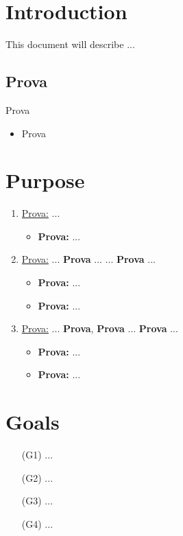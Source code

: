 \documentclass [12pt]{article}
\begin{document}
\tableofcontents

\section{Introduction}
This document will describe ...
\subsection{Prova}
Prova
\begin{itemize}
\item Prova
\end{itemize}
\section{Purpose}
\begin{enumerate}
\item \underline{Prova:} ...
\begin{itemize}[•]
\item \textbf{Prova:} ...
\end{itemize}
\item \underline{Prova:} ... \textbf{Prova} ... 
... \textbf{Prova} ...
\begin{itemize}[•]
\item \textbf{Prova:} ...
\item \textbf{Prova:} ...
\end{itemize}
\item \underline{Prova:} ... \textbf{Prova}, \textbf{Prova} ... \textbf{Prova} ...
\begin{itemize}[•]
\item \textbf{Prova:} ...
\item \textbf{Prova:} ...
\end{itemize}
\end{enumerate}
\section{Goals}
\begin{enumerate}
\item[(G1)] ...
\item[(G2)] ...
\item[(G3)] ...
\item[(G4)] ...
\\

\end{enumerate}
\end{document}
